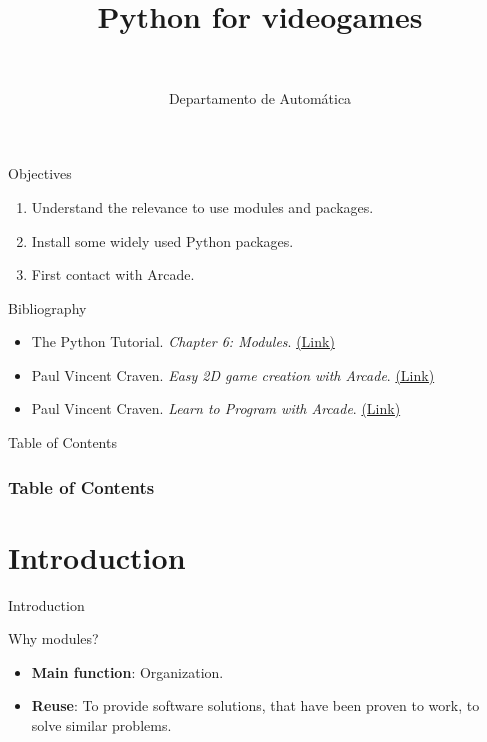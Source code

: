 \documentclass[10pt,compress]{beamer} %
\title[Python for videogames]{Python for videogames}
\author{\asignatura\\\carrera}
\institute{}
\date{Departamento de Automática}
\begin{document}
{\titlepageBlue
    \begin{frame}
        \titlepage
    \end{frame}
}

\institute{\asignatura}

\begin{frame}[plain]{}
	\begin{block}{Objectives}
		\begin{enumerate}
		\item Understand the relevance to use modules and packages.
		\item Install some widely used Python packages.
		\item First contact with Arcade.
		\end{enumerate}
	\end{block}

	\begin{block}{Bibliography}
		\begin{itemize}
			\item The Python Tutorial. \textit{Chapter 6: Modules}. \href{https://docs.python.org/3/tutorial/modules.html}{(Link)}
			\item Paul Vincent Craven. \textit{Easy 2D game creation with Arcade}. \href{https://speakerdeck.com/pycon2018/paul-vincent-craven-easy-2d-game-creation-with-arcade}{(Link)}
			\item Paul Vincent Craven. \textit{Learn to Program with Arcade}. \href{https://learn.arcade.academy/en/latest/}{(Link)}
		\end{itemize}
	\end{block}
\end{frame}

{
\begin{frame}[shrink]{Table of Contents}

 	\frametitle{Table of Contents}
  	\begin{multicols}{2}
  		\tableofcontents
    	\end{multicols}

\end{frame}
}

\section{Introduction}
\begin{frame}{Introduction}
		\begin{block}{Why modules?}
			\begin{itemize}
			\item \textbf{Main function}: Organization.
			\item \textbf{Reuse}: To provide software solutions, that have been proven to work, to solve similar problems.
			\end{itemize}
		\end{block}
\end{frame}
\end{document}

